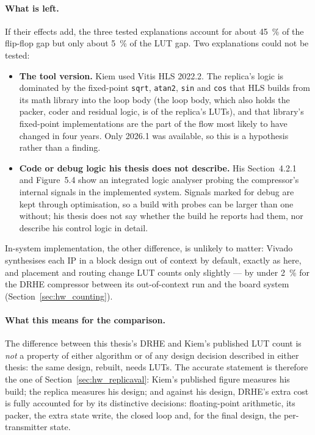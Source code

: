 \paragraph{What is left.} If their effects add, the three tested explanations
account for about \SI{45}{\percent} of the flip-flop gap but only about
\SI{5}{\percent} of the LUT gap. Two explanations could not be tested:
\begin{itemize}
\item \textbf{The tool version.} Kiem used Vitis HLS 2022.2. The replica's
logic is dominated by the fixed-point \texttt{sqrt}, \texttt{atan2},
\texttt{sin} and \texttt{cos} that HLS builds from its math library into the
loop body (the loop body, which also holds the packer, coder and residual
logic, is  of the replica's  LUTs), and that
library's fixed-point implementations are the part of the flow most likely to
have changed in four years. Only 2026.1 was available, so this is a hypothesis
rather than a finding.
\item \textbf{Code or debug logic his thesis does not describe.} His
Section~4.2.1 and Figure~5.4 show an integrated logic analyser probing the
compressor's internal signals in the implemented system. Signals marked for
debug are kept through optimisation, so a build with probes can be larger than
one without; his thesis does not say whether the build he reports had them,
nor describe his control logic in detail.
\end{itemize}
In-system implementation, the other difference, is unlikely to matter: Vivado
synthesises each IP in a block design out of context by default, exactly as
here, and placement and routing change LUT counts only slightly --- by under
\SI{2}{\percent} for the DRHE compressor between its out-of-context run and the
board system (Section~\ref{sec:hw_counting}).

\paragraph{What this means for the comparison.} The difference between
this thesis's DRHE and Kiem's published LUT count is \emph{not} a property of
either algorithm or of any design decision described in either thesis: the same
design, rebuilt, needs  LUTs. The accurate statement is therefore
the one of Section~\ref{sec:hw_replicaval}: Kiem's published figure measures
his build; the replica measures his design; and against his design, DRHE's
extra cost is fully accounted for by its distinctive decisions:
floating-point arithmetic, its packer, the extra state write, the closed loop
and, for the final design, the per-transmitter state.

